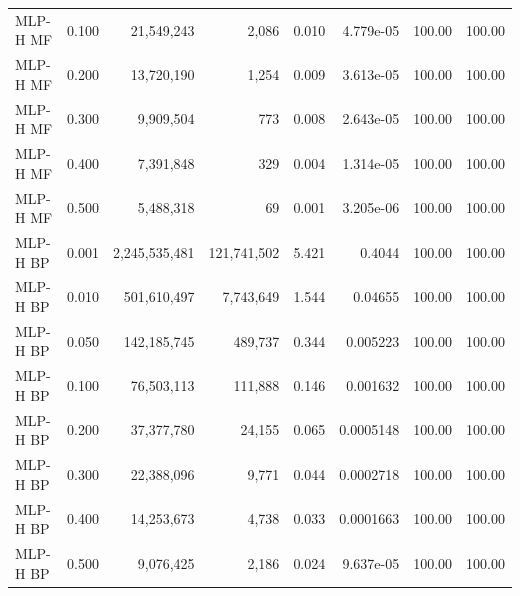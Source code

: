 \begin{longtable}{lrrrrrrr}
MLP-H MF & 0.100 & 21,549,243 & 2,086 & 0.010 & 4.779e-05 & 100.00 & 100.00 \\
MLP-H MF & 0.200 & 13,720,190 & 1,254 & 0.009 & 3.613e-05 & 100.00 & 100.00 \\
MLP-H MF & 0.300 & 9,909,504 & 773 & 0.008 & 2.643e-05 & 100.00 & 100.00 \\
MLP-H MF & 0.400 & 7,391,848 & 329 & 0.004 & 1.314e-05 & 100.00 & 100.00 \\
MLP-H MF & 0.500 & 5,488,318 & 69 & 0.001 & 3.205e-06 & 100.00 & 100.00 \\
MLP-H BP & 0.001 & 2,245,535,481 & 121,741,502 & 5.421 & 0.4044 & 100.00 & 100.00 \\
MLP-H BP & 0.010 & 501,610,497 & 7,743,649 & 1.544 & 0.04655 & 100.00 & 100.00 \\
MLP-H BP & 0.050 & 142,185,745 & 489,737 & 0.344 & 0.005223 & 100.00 & 100.00 \\
MLP-H BP & 0.100 & 76,503,113 & 111,888 & 0.146 & 0.001632 & 100.00 & 100.00 \\
MLP-H BP & 0.200 & 37,377,780 & 24,155 & 0.065 & 0.0005148 & 100.00 & 100.00 \\
MLP-H BP & 0.300 & 22,388,096 & 9,771 & 0.044 & 0.0002718 & 100.00 & 100.00 \\
MLP-H BP & 0.400 & 14,253,673 & 4,738 & 0.033 & 0.0001663 & 100.00 & 100.00 \\
MLP-H BP & 0.500 & 9,076,425 & 2,186 & 0.024 & 9.637e-05 & 100.00 & 100.00 \\
\bottomrule
\end{longtable}
\endgroup
